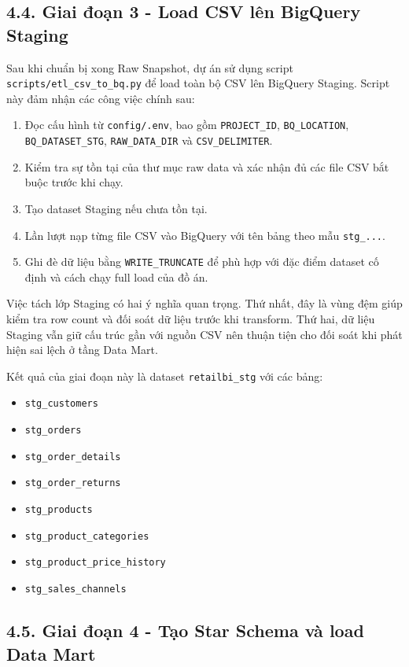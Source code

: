 \documentclass[12pt,a4paper]{article}
\newcommand{\code}[1]{\texttt{#1}}
\begin{document}
\subsection{4.4. Giai đoạn 3 - Load CSV lên BigQuery Staging}

Sau khi chuẩn bị xong Raw Snapshot, dự án sử dụng script \code{scripts/etl\_csv\_to\_bq.py} để load toàn bộ CSV lên BigQuery Staging. Script này đảm nhận các công việc chính sau:

\begin{enumerate}
    \item Đọc cấu hình từ \code{config/.env}, bao gồm \code{PROJECT\_ID}, \code{BQ\_LOCATION}, \code{BQ\_DATASET\_STG}, \code{RAW\_DATA\_DIR} và \code{CSV\_DELIMITER}.
    \item Kiểm tra sự tồn tại của thư mục raw data và xác nhận đủ các file CSV bắt buộc trước khi chạy.
    \item Tạo dataset Staging nếu chưa tồn tại.
    \item Lần lượt nạp từng file CSV vào BigQuery với tên bảng theo mẫu \code{stg\_...}.
    \item Ghi đè dữ liệu bằng \code{WRITE\_TRUNCATE} để phù hợp với đặc điểm dataset cố định và cách chạy full load của đồ án.
\end{enumerate}

Việc tách lớp Staging có hai ý nghĩa quan trọng. Thứ nhất, đây là vùng đệm giúp kiểm tra row count và đối soát dữ liệu trước khi transform. Thứ hai, dữ liệu Staging vẫn giữ cấu trúc gần với nguồn CSV nên thuận tiện cho đối soát khi phát hiện sai lệch ở tầng Data Mart.

Kết quả của giai đoạn này là dataset \code{retailbi\_stg} với các bảng:

\begin{itemize}
    \item \code{stg\_customers}
    \item \code{stg\_orders}
    \item \code{stg\_order\_details}
    \item \code{stg\_order\_returns}
    \item \code{stg\_products}
    \item \code{stg\_product\_categories}
    \item \code{stg\_product\_price\_history}
    \item \code{stg\_sales\_channels}
\end{itemize}

\subsection{4.5. Giai đoạn 4 - Tạo Star Schema và load Data Mart}
\end{document}
